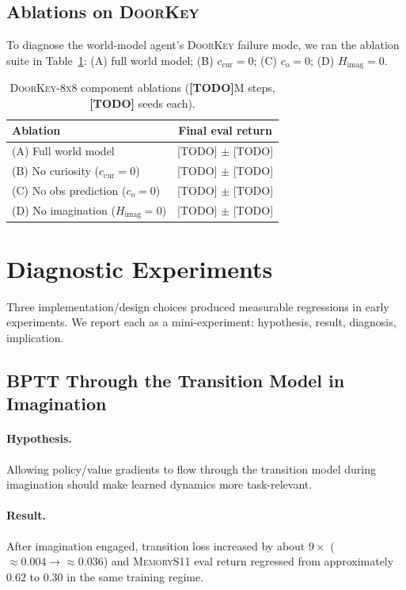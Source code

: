 \subsection{Ablations on \textsc{DoorKey}}

To diagnose the world-model agent's \textsc{DoorKey} failure mode, we ran the ablation suite in Table~\ref{tab:ablation}: (A) full world model; (B) $c_\text{cur}\!=\!0$; (C) $c_\text{o}\!=\!0$; (D) $H_\text{imag}\!=\!0$.

\begin{table}[t]
\centering
\small
\begin{tabular}{lc}
\toprule
Ablation & Final eval return \\
\midrule
(A) Full world model                     & [TODO] $\pm$ [TODO] \\
(B) No curiosity ($c_\text{cur}=0$)      & [TODO] $\pm$ [TODO] \\
(C) No obs prediction ($c_\text{o}=0$)   & [TODO] $\pm$ [TODO] \\
(D) No imagination ($H_\text{imag}=0$)   & [TODO] $\pm$ [TODO] \\
\bottomrule
\end{tabular}
\caption{\textsc{DoorKey-8x8} component ablations (\textbf{[TODO]}M steps, \textbf{[TODO]} seeds each).}
\label{tab:ablation}
\end{table}

\section{Diagnostic Experiments}
\label{sec:diagnostics}

Three implementation/design choices produced measurable regressions in early experiments. We report each as a mini-experiment: hypothesis, result, diagnosis, implication.

\subsection{BPTT Through the Transition Model in Imagination}

\paragraph{Hypothesis.}
Allowing policy/value gradients to flow through the transition model during imagination should make learned dynamics more task-relevant.

\paragraph{Result.}
After imagination engaged, transition loss increased by about $9\times$ (\textbf{$\approx 0.004 \rightarrow \approx 0.036$}) and \textsc{MemoryS11} eval return regressed from approximately $0.62$ to $0.30$ in the same training regime.


